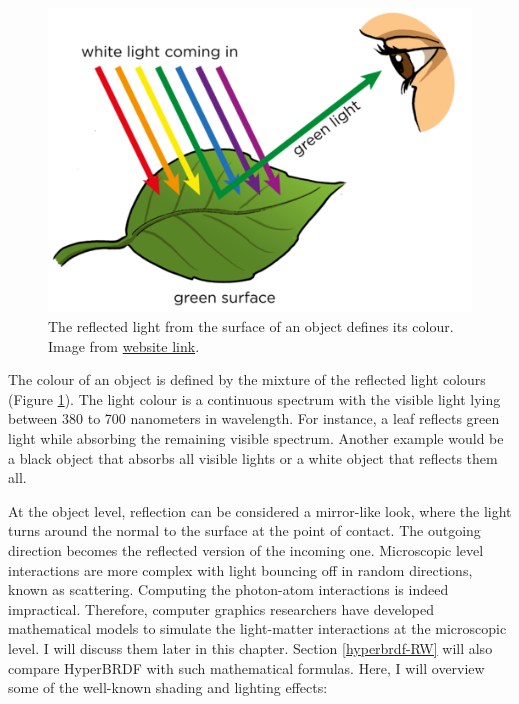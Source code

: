 \begin{figure}
  \centering
   \includegraphics[width=\linewidth]{Images/object-colour.png}
   \caption{The reflected light from the surface of an object defines its colour. Image from \href{http://www.mstworkbooks.co.za/natural-sciences/gr8/images/gr8ec04-gd-0027.png}{website link}.}
   \label{fig:object-colour}
\end{figure}

The colour of an object is defined by the mixture of the reflected light colours (Figure \ref{fig:object-colour}). The light colour is a continuous spectrum with the visible light lying between 380 to 700 nanometers in wavelength. For instance, a leaf reflects green light while absorbing the remaining visible spectrum. Another example would be a black object that absorbs all visible lights or a white object that reflects them all.

At the object level, reflection can be considered a mirror-like look, where the light turns around the normal to the surface at the point of contact. The outgoing direction becomes the reflected version of the incoming one. Microscopic level interactions are more complex with light bouncing off in random directions, known as scattering. Computing the photon-atom interactions is indeed impractical. Therefore, computer graphics researchers have developed mathematical models to simulate the light-matter interactions at the microscopic level. I will discuss them later in this chapter. Section \ref{hyperbrdf-RW} will also compare HyperBRDF with such mathematical formulas. Here, I will overview some of the well-known shading and lighting effects:


